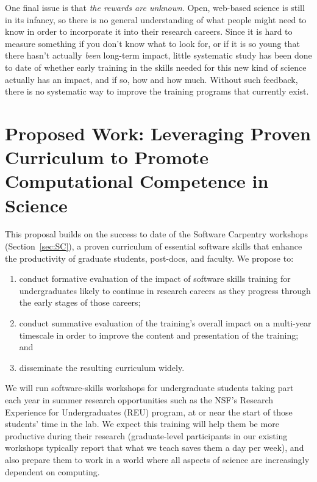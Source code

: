 \documentclass{proposalnsf}
\begin{document}
One final issue is that \emph{the rewards are unknown}.  Open,
web-based science is still in its infancy, so there is no general
understanding of what people might need to know in order to
incorporate it into their research careers.  Since it is hard to
measure something if you don't know what to look for, or if it is so
young that there hasn't actually \emph{been} long-term impact, little
systematic study has been done to date of whether early training in
the skills needed for this new kind of science actually has an impact,
and if so, how and how much.  Without such feedback, there is no
systematic way to improve the training programs that currently exist.

\section{Proposed Work: Leveraging Proven Curriculum to Promote Computational Competence in Science}

This proposal builds on the success to date of the Software Carpentry
workshops (Section~\ref{sec:SC}), a proven curriculum of essential
software skills that enhance the productivity of graduate students,
post-docs, and faculty.  We propose to:

\begin{enumerate}

\item
  conduct formative evaluation of the impact of software skills
  training for undergraduates likely to continue in research careers
  as they progress through the early stages of those careers;

\item
  conduct summative evaluation of the training's overall impact on a
  multi-year timescale in order to improve the content and
  presentation of the training; and

\item
  disseminate the resulting curriculum widely.

\end{enumerate}

We will run software-skills workshops for undergraduate students
taking part each year in summer research opportunities such as the
NSF's Research Experience for Undergraduates (REU) program, at or near
the start of those students' time in the lab.  We expect this training
will help them be more productive during their research (graduate-level
participants in our existing workshops typically report that what we
teach saves them a day per week), and also prepare them to work in a
world where all aspects of science are increasingly dependent on
computing.
\end{document}

